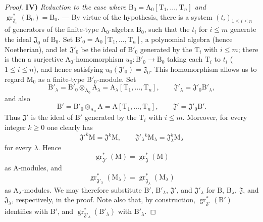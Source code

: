 \begin{proof}
\medskip
\noindent\textbf{IV)} \emph{Reduction to the case where $\mathrm{B}_0=\mathrm{A}_0[\mathrm{T}_1,\ldots,\mathrm{T}_n]$ and $\operatorname{gr}^*_{\mathfrak{J}_0}(\mathrm{B}_0)=\mathrm{B}_0$.} --- By virtue of the hypothesis, there is a system $(t_i)_{1\leqslant i\leqslant n}$ of generators of the finite-type $\mathrm{A}_0$-algebra $\mathrm{B}_0$, such that the $t_i$ for $i\leqslant m$ generate the ideal $\mathfrak{J}_0$ of $\mathrm{B}_0$. Set $\mathrm{B}'_0=\mathrm{A}_0[\mathrm{T}_1,\ldots,\mathrm{T}_n]$, a polynomial algebra (hence Noetherian), and let $\mathfrak{J}'_0$ be the ideal of $\mathrm{B}'_0$ generated by the $\mathrm{T}_i$ with $i\leqslant m$; there is then a surjective $\mathrm{A}_0$-homomorphism $u_0:\mathrm{B}'_0\to\mathrm{B}_0$ taking each $\mathrm{T}_i$ to $t_i$ ($1\leqslant i\leqslant n$), and hence satisfying $u_0(\mathfrak{J}'_0)=\mathfrak{J}_0$. This homomorphism allows us to regard $\mathrm{M}_0$ as a finite-type $\mathrm{B}'_0$-module. Set
\[
  \mathrm{B}'_\lambda=\mathrm{B}'_0\otimes_{\mathrm{A}_0}\mathrm{A}_\lambda
  =\mathrm{A}_\lambda[\mathrm{T}_1,\ldots,\mathrm{T}_n],
  \qquad
  \mathfrak{J}'_\lambda=\mathfrak{J}'_0\mathrm{B}'_\lambda,
\]
and also
\[
  \mathrm{B}'=\mathrm{B}'_0\otimes_{\mathrm{A}_0}\mathrm{A}
  =\mathrm{A}[\mathrm{T}_1,\ldots,\mathrm{T}_n],
  \qquad
  \mathfrak{J}'=\mathfrak{J}'_0\mathrm{B}'.
\]
Thus $\mathfrak{J}'$ is the ideal of $\mathrm{B}'$ generated by the $\mathrm{T}_i$ with $i\leqslant m$. Moreover, for every integer $k\geqslant 0$ one clearly has
\[
  \mathfrak{J}'^k\mathrm{M}=\mathfrak{J}^k\mathrm{M},
  \qquad
  \mathfrak{J}'_\lambda{}^k\mathrm{M}_\lambda
  =\mathfrak{J}_\lambda^k\mathrm{M}_\lambda
\]
for every $\lambda$. Hence
\[
  \operatorname{gr}^*_{\mathfrak{J}'}(\mathrm{M})
  =\operatorname{gr}^*_{\mathfrak{J}}(\mathrm{M})
\]
as $\mathrm{A}$-modules, and
\[
  \operatorname{gr}^*_{\mathfrak{J}'_\lambda}(\mathrm{M}_\lambda)
  =\operatorname{gr}^*_{\mathfrak{J}_\lambda}(\mathrm{M}_\lambda)
\]
as $\mathrm{A}_\lambda$-modules. We may therefore substitute $\mathrm{B}'$, $\mathrm{B}'_\lambda$, $\mathfrak{J}'$, and $\mathfrak{J}'_\lambda$ for $\mathrm{B}$, $\mathrm{B}_\lambda$, $\mathfrak{J}$, and $\mathfrak{J}_\lambda$, respectively, in the proof. Note also that, by construction, $\operatorname{gr}^*_{\mathfrak{J}'}(\mathrm{B}')$ identifies with $\mathrm{B}'$, and $\operatorname{gr}^*_{\mathfrak{J}'_\lambda}(\mathrm{B}'_\lambda)$ with $\mathrm{B}'_\lambda$.


\end{proof}
